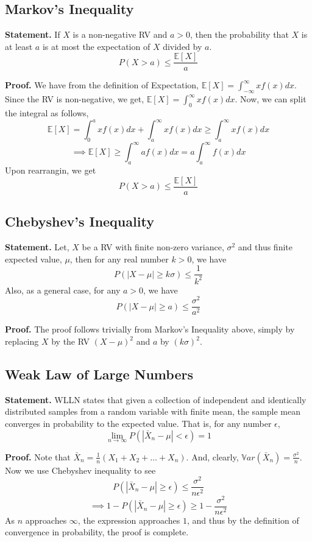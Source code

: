 \subsection{Markov's Inequality}

\textbf{Statement.} If $X$ is a non-negative RV and $a>0$, then the probability that $X$ is at least $a$ is at most the expectation of $X$ divided by $a$.
\[P\left(X > a\right) \leq \frac{\mathbb{E}[X]}{a}\]

\textbf{Proof.} We have from the definition of Expectation, $\mathbb{E}[X] = \int_{- \infty}^{\infty} x f(x) dx$. Since the RV is non-negative, we get, $\mathbb{E}[X] = \int_{0}^{\infty} x f(x) dx$. Now, we can split the integral as follows,
\[\mathbb{E}[X] = \int_{0}^{a} x f(x) dx + \int_{a}^{\infty} x f(x) dx \geq \int_{a}^{\infty} x f(x) dx\]
\[\implies \mathbb{E}[X] \geq \int_{a}^{\infty} a f(x) dx = a \int_{a}^{\infty} f(x) dx\]
Upon rearrangin, we get
\[P\left(X > a\right) \leq \frac{\mathbb{E}[X]}{a}\]

\subsection{Chebyshev's Inequality}

\textbf{Statement.} Let, $X$ be a RV with finite non-zero variance, $\sigma^2$ and thus finite expected value, $\mu$, then for any real number $k > 0 $, we have \[
P(\left|X - \mu\right| \geq k\sigma) \leq \frac{1}{k^2}\]
Also, as a general case, for any $a > 0$, we have 
\[P(\left|X - \mu\right| \geq a) \leq \frac{\sigma^2}{a^2}\]

\textbf{Proof.} The proof follows trivially from Markov's Inequality above, simply by replacing $X$ by the RV $(X - \mu)^2$ and $a$ by $(k\sigma)^2$.

\subsection{Weak Law of Large Numbers}

\textbf{Statement.} WLLN states that given a collection of independent and identically distributed samples from a random variable with finite mean, the sample mean converges in probability to the expected value. That is, for any number $\epsilon$, 
\[\lim_{n \to \infty} P\left(|\bar{X}_n - \mu| < \epsilon \right) = 1\]

\textbf{Proof.} Note that $\bar{X}_n = \frac{1}{n} (X_1 + X_2 + \dots + X_n)$. And, clearly, $\mathbb{V}ar(\bar{X}_n) = \frac{\sigma^2}{n}$. Now we use Chebyshev inequality to see 
\[P(\left|\bar{X}_n - \mu\right| \geq \epsilon) \leq \frac{\sigma^2}{n\epsilon^2}\]
\[\implies 1 - P(\left|\bar{X}_n - \mu\right| \geq \epsilon) \geq 1 - \frac{\sigma^2}{n\epsilon^2}\]
As $n$ approaches $\infty$, the expression approaches $1$, and thus by the definition of convergence in probability, the proof is complete.


%